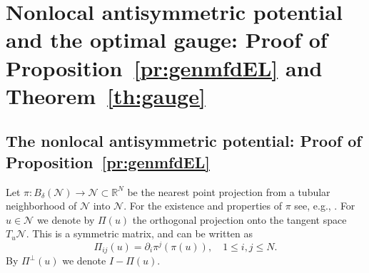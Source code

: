 \documentclass[12pt]{amsart}
\theoremstyle{definition}
\newcommand{\R}{\mathbb{R}}
\numberwithin{theorem}{section} \numberwithin{equation}{section}
\begin{document}
\appendix
\section{Nonlocal antisymmetric potential and the optimal gauge: Proof of Proposition~\ref{pr:genmfdEL} and Theorem~\ref{th:gauge}}
\subsection{The nonlocal antisymmetric potential: Proof of Proposition~\ref{pr:genmfdEL}}\label{s:genmfdEL}
% 
Let $\pi: B_\delta(\mathcal{N}) \to \mathcal{N}\subset \R^N$ be the nearest point projection from a tubular neighborhood of $\mathcal{N}$ into $\mathcal{N}$. For the existence and properties of $\pi$ see, e.g., \cite{Simon-1996}. 
For $u \in \mathcal{N}$ we denote by $\Pi(u)$ the orthogonal projection onto the tangent space $T_u \mathcal{N}$. This is a symmetric matrix, and can be written as 
\[\Pi_{ij}(u) = \partial_{i} \pi^j(\pi(u)),\quad 1\leq i,j \leq N.\]
By $\Pi^\perp(u)$ we denote $I-\Pi(u)$. 
\end{document}
